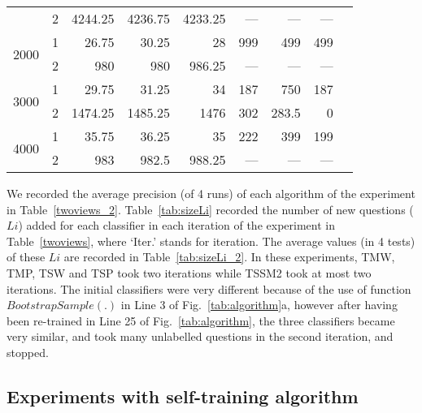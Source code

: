 \documentclass[english]{jnlp_1.4}
\begin{document}
\begin{table}[t]
\begin{tabular}{|c|c|r|r|r|r|r|r|r|r|r|}
 &          2 &    4244.25 &    4236.75 &    4233.25 &          --- &         --- &          --- &               \multicolumn{ 3}{|c}{} \\
\cline{1-8}
\multirow{ 2}{*}{2000} &          1 &      26.75 &      30.25 &         28 &        999 &        499 &        499 &               \multicolumn{ 3}{|c}{} \\
 &          2 &        980 &        980 &     986.25 &          --- &          --- &          --- &               \multicolumn{ 3}{|c}{} \\
\cline{1-8}
\multirow{ 2}{*}{3000} &          1 &      29.75 &      31.25 &         34 &        187 &        750 &        187 &               \multicolumn{ 3}{|c}{} \\
 &          2 &    1474.25 &    1485.25 &       1476 &        302 &      283.5 &          0 &               \multicolumn{ 3}{|c}{} \\
\cline{1-8}
\multirow{2}{*}{4000} &          1 &      35.75 &      36.25 &         35 &        222 &        399 &        199 &               \multicolumn{ 3}{|c}{} \\
 &          2 &        983 &      982.5 &     988.25 &          --- &          --- &          --- &               \multicolumn{ 3}{|c}{} \\
\cline{1-8}
\end{tabular}
\end{table}

We recorded the average precision (of 4 runs) of each algorithm of
the experiment in Table~\ref{twoviews_2}. Table~\ref{tab:sizeLi}
recorded the number of new questions ($L{i}$) added for each
classifier in each iteration of the experiment in
Table~\ref{twoviews}, where `Iter.' stands for iteration. The
average values (in 4 tests) of these $L{i}$ are recorded in
Table~\ref{tab:sizeLi_2}. In these experiments, TMW, TMP, TSW and
TSP took two iterations while TSSM2 took at most two iterations.
The initial classifiers were very different because of the use of
function $BootstrapSample(.)$ in Line 3 of
Fig.~\ref{tab:algorithm}a, however after having been re-trained in
Line 25 of Fig.~\ref{tab:algorithm}, the three classifiers became
very similar, and took many unlabelled questions in the second
iteration, and stopped.


\subsection{Experiments with self-training algorithm}
\end{document}
